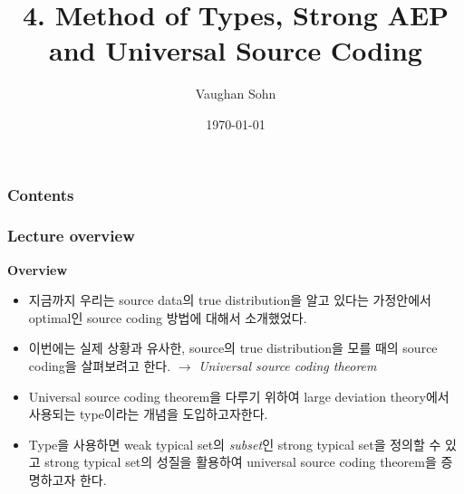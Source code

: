 \documentclass[9pt]{beamer}
\title{4. Method of Types, Strong AEP and Universal Source Coding}
\date{\today}
\author{Vaughan Sohn}
\begin{document}
    \maketitle
    
    \begin{frame}
        \frametitle{Contents}
        \tableofcontents
    \end{frame}


    \begin{frame}
        \frametitle{Lecture overview}
        \textbf{Overview}
        \vspace{0.4cm}
        \begin{itemize}
            \item 지금까지 우리는 source data의 true distribution을 알고 있다는 가정안에서 optimal인 source coding 방법에 대해서 소개했었다.
            \item 이번에는 실제 상황과 유사한, source의 true distribution을 모를 때의 source coding을 살펴보려고 한다. $\rightarrow$ \textit{Universal source coding theorem}
            \item Universal source coding theorem을 다루기 위하여 large deviation theory에서 사용되는 \alert{type}이라는 개념을 도입하고자한다.
            \item Type을 사용하면 weak typical set의 \textit{subset}인 strong typical set을 정의할 수 있고 strong typical set의 성질을 활용하여 universal source coding theorem을 증명하고자 한다.
        \end{itemize}
    \end{frame}
\end{document}
